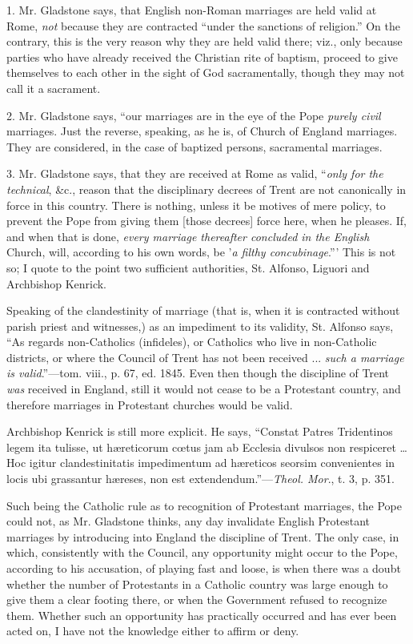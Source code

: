 1. Mr. Gladstone says, that English non-Roman marriages are held
valid at Rome, \emph{not} because they are contracted ``under the
sanctions of religion.'' On the contrary, this is the very reason
why they are held valid there; viz., only because parties who have
already received the Christian rite of baptism, proceed to give
themselves to each other in the sight of God sacramentally, though they
may not call it a sacrament.

2. Mr. Gladstone says, ``our marriages are in the eye of the Pope
\emph{purely civil} marriages. Just the reverse, speaking, as he is, of
Church of England marriages. They are considered, in the case of
baptized persons, sacramental marriages.

3. Mr. Gladstone says, that they are received at Rome as valid,
``\emph{only for the technical}, \&c., reason that the
disciplinary decrees of Trent are not canonically in force in this
country. There is nothing, unless it be motives of mere policy, to
prevent the Pope from giving them [those decrees] force here, when he
pleases. If, and when that is done, \emph{every marriage thereafter
concluded in the English} Church, will, according to his own words,
be '\emph{a filthy concubinage}.''' This is not so; I quote to the
point two sufficient authorities, St. Alfonso, Liguori and Archbishop
Kenrick.

Speaking of the clandestinity of marriage (that is, when it is
contracted without parish priest and witnesses,) as an impediment to its
validity, St. Alfonso says, ``As regards non-Catholics (infideles),
or Catholics who live in non-Catholic districts, or where the Council of
Trent has not been received ... \emph{such a marriage is valid}.''—tom.
viii., p. 67, ed. 1845. Even then though the discipline of Trent \emph{was}
received in England, still it would not cease to be a Protestant
country, and therefore marriages in Protestant churches would be valid.

Archbishop Kenrick is still more explicit. He says, ``Constat
Patres Tridentinos legem ita tulisse, ut hæreticorum cœtus jam ab
Ecclesia divulsos non respiceret … Hoc igitur clandestinitatis
impedimentum ad hæreticos seorsim convenientes in locis ubi grassantur
hæreses, non est extendendum.''—\emph{Theol. Mor}., t. 3, p. 351.

Such being the Catholic rule as to recognition of Protestant
marriages, the Pope could not, as Mr. Gladstone thinks, any day
invalidate English Protestant marriages by introducing into England the
discipline of Trent. The only case, in which, consistently with the
Council, any opportunity might occur to the Pope, according to his
accusation, of playing fast and loose, is when there was a doubt whether
the number of Protestants in a Catholic country was large enough to give
them a clear footing there, or when the Government refused to recognize
them. Whether such an opportunity has practically occurred and has ever
been acted on, I have not the knowledge either to affirm or deny.

